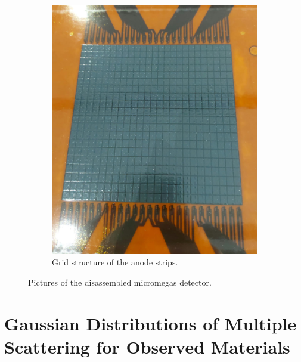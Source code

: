 \documentclass[sn-mathphys-num,iicol]{sn-jnl}
\theoremstyle{thmstyleone}
\theoremstyle{thmstyletwo}
\theoremstyle{thmstylethree}
\begin{document}
\begin{figure}[h]
\begin{subfigure}{0.36\textwidth}
        \includegraphics[width=\linewidth]{figures/micromegas_strips.jpeg}
        \caption{Grid structure of the anode strips.}
        \label{fig:micromegas_strips}
    \end{subfigure}
    \caption{Pictures of the disassembled micromegas detector.}
    \label{fig:mircro_wow}
\end{figure}



\clearpage
\section{Gaussian Distributions of Multiple Scattering for Observed Materials}
\renewcommand{\thefigure}{\Alph{section}\arabic{figure}}
\setcounter{figure}{0}
\renewcommand{\thetable}{\Alph{section}\arabic{table}}
\setcounter{table}{0}
\end{document}
